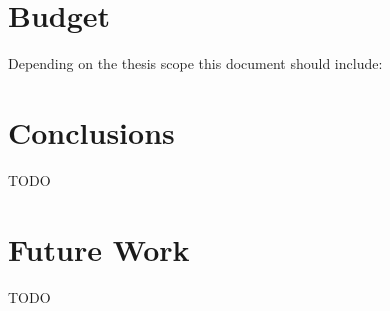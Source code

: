 \documentclass[a4paper,12pt]{article}
\begin{document}
\clearpage
\section{Budget}

{Depending on the thesis scope this document should include:}

%

\clearpage
\section{Conclusions}
\label{sec:conclusions}

TODO

\section{Future Work}
\label{sec:futwork}

TODO

\newpage

\medskip




\clearpage
\newpage
\begin{appendices}



\end{appendices}

\cleardoublepage
{}
\printacronyms[include=abbrev,name=Glossary]
\end{document}
